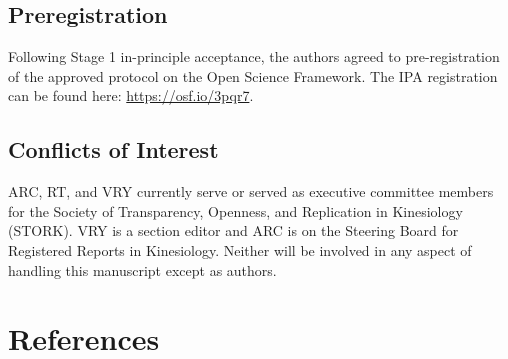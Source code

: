 \documentclass[]{cik}%
\begin{document}
\hypertarget{preregistration}{%
\subsection{Preregistration}\label{preregistration}}

Following Stage 1 in-principle acceptance, the authors agreed to
pre-registration of the approved protocol on the Open Science Framework.
The IPA registration can be found here: \url{https://osf.io/3pqr7}.

\hypertarget{conflicts-of-interest}{%
\subsection{Conflicts of Interest}\label{conflicts-of-interest}}

ARC, RT, and VRY currently serve or served as executive committee
members for the Society of Transparency, Openness, and Replication in
Kinesiology (STORK). VRY is a section editor and ARC is on the Steering
Board for Registered Reports in Kinesiology. Neither will be involved in
any aspect of handling this manuscript except as authors.

\newpage

\hypertarget{references}{%
\section{References}\label{references}}

\parindent0pt 
\setlength{\parskip}{1em}
\end{document}
